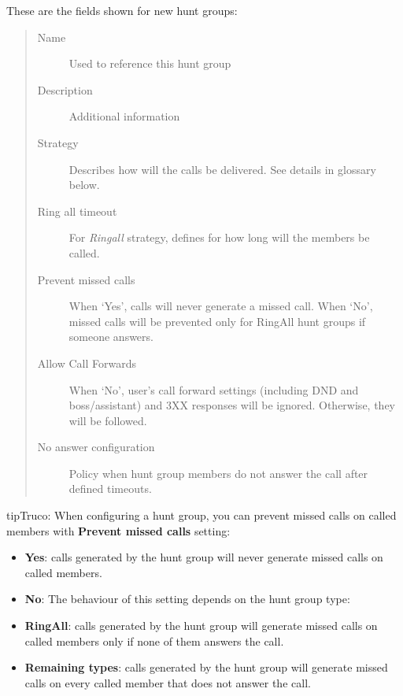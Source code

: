 \documentclass[letterpaper,10pt,spanish]{sphinxmanual}
\begin{document}
These are the fields shown for new hunt groups:
\begin{quote}
\begin{description}
\item[{Name}] \leavevmode
Used to reference this hunt group

\item[{Description}] \leavevmode
Additional information

\item[{Strategy}] \leavevmode
Describes how will the calls be delivered. See details in glossary below.

\item[{Ring all timeout}] \leavevmode
For \emph{Ringall} strategy, defines for how long will the members be called.

\item[{Prevent missed calls}] \leavevmode
When `Yes', calls will never generate a missed call. When `No', missed calls will be prevented only for RingAll
hunt groups if someone answers.

\item[{Allow Call Forwards}] \leavevmode
When `No', user's call forward settings (including DND and boss/assistant) and 3XX responses will be ignored. Otherwise, they will be followed.

\item[{No answer configuration}] \leavevmode
Policy when hunt group members do not answer the call after defined timeouts.

\end{description}
\end{quote}

\begin{notice}{tip}{Truco:}
When configuring a hunt group, you can prevent missed calls on called members with \textbf{Prevent missed calls} setting:
\begin{itemize}
\item {} 
\textbf{Yes}: calls generated by the hunt group will never generate missed calls on called members.

\item {} 
\textbf{No}: The behaviour of this setting depends on the hunt group type:

\item {} 
\textbf{RingAll}: calls generated by the hunt group will generate missed calls on called members only if none of them answers the call.

\item {} 
\textbf{Remaining types}: calls generated by the hunt group will generate missed calls on every called member that does not answer the call.

\end{itemize}
\end{notice}
\end{document}
